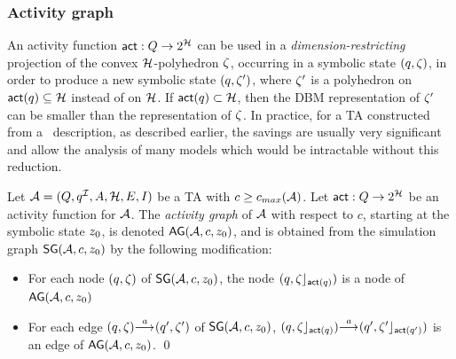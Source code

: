 \subsubsection{Activity graph}
An activity function $\act : \tglocs \fun 2^\tgclks$ can be used in a
\emph{dimension-restricting} projection of the convex
$\clocks$-polyhedron ${\zeta}$, occurring in a symbolic state
$(q,{\zeta})$, in order to produce a new symbolic state
$(q,{\zeta}')$, where ${\zeta}'$ is a polyhedron on
$\act(\tgloc) \subseteq \clocks$ instead of on $\clocks$. If
$\act(\tgloc) \subset \clocks$, then the DBM representation of
${\zeta}'$ can be smaller than the representation of ${\zeta}$.  In
practice, for a TA constructed from a \bcandle\ description, as
described earlier, the savings are usually very significant and allow
the analysis of many models which would be intractable without
this reduction.
\begin{definition}\label{def:sgactivitygraph} 
Let $\AA = (\tglocs,\tgiloc,\Actions,\tgclks,\tgedges,\tginv)$ be a TA
with $c \geq \cmax(\AA)$. Let $\act : \tglocs
\fun 2^\tgclks$ be an activity function for $\AA$. 
The \emph{activity graph} of $\AA$ with respect to $c$, starting at
the symbolic state $z_0$, is denoted $\AG(\AA,c,\z_0)$, and is
obtained from the simulation graph $\SG(\AA,c,\z_0)$ by the following
modification:
\begin{itemize}
\item For each node $(q,{\zeta})$ of $\SG(\AA,c,\z_0)$, the node
  $(q, {\zeta}\rfloor_{{\mathop{\sf act}}(q)})$ is a node of 
  $\AG(\AA,c,\z_0)$
\item For each edge $(q,{\zeta}) {\mathrel{{\stackrel{a}{\longrightarrow_{\mathrm{{}}}}}}} (q',{\zeta}')$
  of $\SG(\AA,c,\z_0)$, $(q,{\zeta}\rfloor_{{\mathop{\sf act}}(q)})
  {\mathrel{{\stackrel{a}{\longrightarrow_{\mathrm{{}}}}}}} (q',{\zeta}'\rfloor_{{\mathop{\sf act}}(q')})$ is an edge
  of $\AG(\AA,c,\z_0)$.
\qed
\end{itemize}
\end{definition}

